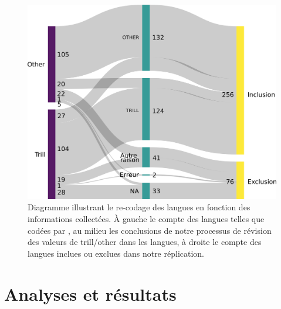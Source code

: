 \begin{figure}
	\centering
	\includegraphics[width=1\linewidth]{substance/images/gramms}
	\caption[Diagramme illustrant le re-codage des langues en fonction des informations collectées]{Diagramme illustrant le re-codage des langues en fonction des informations collectées. À gauche le compte des langues telles que codées par \citeauthor{winterTrilledAssociatedRoughness2022}, au milieu les conclusions de notre processus de révision des valeurs de trill/other dans les langues, à droite le compte des langues inclues ou exclues dans notre réplication.}
	\label{fig:gramms}
\end{figure}


\section{Analyses et résultats}


